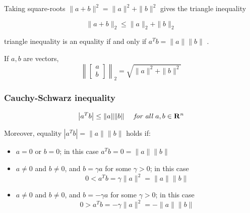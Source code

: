 \begin{corollary}
    Taking square-roots $ \|a+b\|^{2}=\|a\|^{2}+\|b\|^{2} $ gives the triangle inequality

    \begin{equation}\| a + b \|_2 \le \|a \|_2 + \|b \|_2 \end{equation}

triangle inequality is an equality if and only if $ a^{T} b=\|a\|\|b\| $ .
\end{corollary}

\begin{corollary}
    If $ a, b $ are vectors,
\begin{equation}
\left\|\left[\begin{array}{l}
a \\
b
\end{array}\right]\right\|_2 =\sqrt{\|a\|^{2}+\|b\|^{2}}
\end{equation}
\end{corollary}

\subsubsection{Cauchy-Schwarz inequality}

\begin{theorem}
    \begin{equation} \left|a^{T} b\right| \leq\|a\|\|b\| \quad \term{ for all } a, b \in \mathbf{R}^{n} \end{equation}
\end{theorem}

\begin{corollary}
    Moreover, equality $ \left|a^{T} b\right|=\|a\|\|b\| $ holds if:

\begin{itemize}
    \item $ a=0 $ or $ b=0 $; in this case $ a^{T} b=0=\|a\|\|b\| $
    \item $ a \neq 0 $ and $ b \neq 0 $, and $ b=\gamma a $ for some $ \gamma>0 $; in this case
    \begin{equation}
    0<a^{T} b=\gamma\|a\|^{2}=\|a\|\|b\|
    \end{equation}

    \item $ a \neq 0 $ and $ b \neq 0 $, and $ b=-\gamma a $ for some $ \gamma>0 $; in this case
    \begin{equation}
    0>a^{T} b=-\gamma\|a\|^{2}=-\|a\|\|b\|
    \end{equation}
\end{itemize}
\end{corollary}

